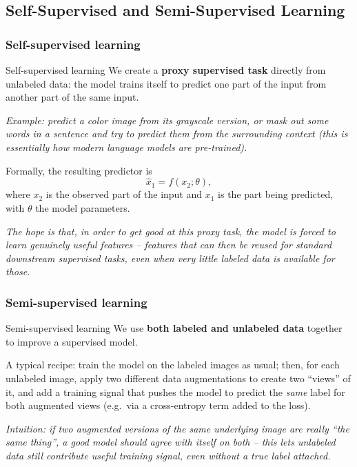 \subsection{Self-Supervised and Semi-Supervised Learning}\label{sec:rl-intro-self-semi-supervised}

\subsubsection{Self-supervised learning}

\begin{defbox}{Self-supervised learning}
We create a \textbf{proxy supervised task} directly from unlabeled data: the model trains itself to predict one part of the input from another part of the same input.

\textit{Example: predict a color image from its grayscale version, or mask out some words in a sentence and try to predict them from the surrounding context (this is essentially how modern language models are pre-trained).}
\end{defbox}

Formally, the resulting predictor is
\[
  \hat{x}_1 = f(x_2; \theta),
\]
where $x_2$ is the observed part of the input and $x_1$ is the part being predicted, with $\theta$ the model parameters.

\textit{The hope is that, in order to get good at this proxy task, the model is forced to learn genuinely useful features -- features that can then be reused for standard downstream supervised tasks, even when very little labeled data is available for those.}

\subsubsection{Semi-supervised learning}

\begin{defbox}{Semi-supervised learning}
We use \textbf{both labeled and unlabeled data} together to improve a supervised model.
\end{defbox}

A typical recipe: train the model on the labeled images as usual; then, for each unlabeled image, apply two different data augmentations to create two ``views'' of it, and add a training signal that pushes the model to predict the \textit{same} label for both augmented views (e.g.\ via a cross-entropy term added to the loss).

\textit{Intuition: if two augmented versions of the same underlying image are really ``the same thing'', a good model should agree with itself on both -- this lets unlabeled data still contribute useful training signal, even without a true label attached.}

